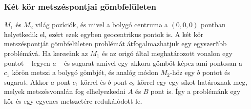 \subsubsection{Két kör metszéspontjai gömbfelületen}

$M_1$ és $M_2$ világ pozíciók, és mivel a bolygó centruma a $(0, 0, 0)$ pontban helyetkedik el, ezért ezek egyben geocentrikus pontok is. A két kör metszéspontját gömbfelületen problémát átfogalmazhatjuk egy egyszerűbb problémává. Ha keresünk az $M_1$ és az origó által meghatározott vonalon egy pontot -- legyen $a$ -- és sugarat amivel egy akkora gömböt képez ami pontosan a $c_1$ körön metszi a bolygó gömbjét, és analóg módon $M_2$-höz egy $b$ pontot és sugarat. Akkor $a$ pont $c_1$ körrel és $b$ pont $c_2$ körrel egy-egy síkot határoznak meg, melyek metszésvonalán fog elhelyezkedni $A$ és $B$ pont is. Így a problémánk egy kör és egy egyenes metszetére redukálódott le.

